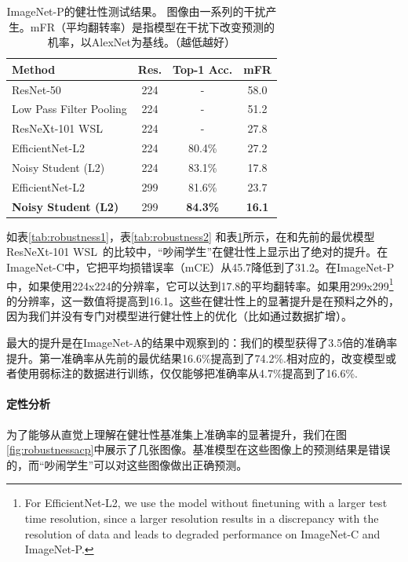 \documentclass[10pt]{article}
\begin{document}
\begin{table}[h!]
	\small
	\centering
	\begin{tabular}{l|c|cc}         
		\toprule 
		Method & Res. & Top-1 Acc. & mFR \\
		\midrule
		ResNet-50 \cite{hendrycks2018benchmarking} & 224 & - & 58.0 \\
		Low Pass Filter Pooling \cite{zhang2019making} &224 & - & 51.2 \\
		
		ResNeXt-101 WSL~\cite{mahajan2018exploring,orhan2019robustness} & 224 & - & 27.8  \\
		\midrule
		EfficientNet-L2  & 224 & 80.4\% & 27.2  \\
		Noisy Student (L2) & 224 &  83.1\% & 17.8  \\
		EfficientNet-L2  & 299 & 81.6\% &  23.7 \\
		\bf Noisy Student (L2) & 299 & \bf 84.3\% & \bf 16.1 \\
		\bottomrule
	\end{tabular}
	\caption{ImageNet-P的健壮性测试结果。 图像由一系列的干扰产生。mFR（平均翻转率）是指模型在干扰下改变预测的机率，以AlexNet为基线。（越低越好）}  
	\label{tab:robustness3}
\end{table}

如表\ref{tab:robustness1}，表\ref{tab:robustness2} 和表\ref{tab:robustness3}所示，在和先前的最优模型ResNeXt-101 WSL~\cite{mahajan2018exploring,orhan2019robustness}的比较中，“吵闹学生”在健壮性上显示出了绝对的提升。在ImageNet-C中，它把平均损错误率（mCE）从45.7降低到了31.2。在ImageNet-P中，如果使用224x224的分辨率，它可以达到17.8的平均翻转率。如果用299x299\footnote{For EfficientNet-L2, we use the model without finetuning with a larger test time resolution, since a larger resolution results in a discrepancy with the resolution of data and leads to degraded performance on ImageNet-C and ImageNet-P.}的分辨率，这一数值将提高到16.1。这些在健壮性上的显著提升是在预料之外的，因为我们并没有专门对模型进行健壮性上的优化（比如通过数据扩增）。  


最大的提升是在ImageNet-A的结果中观察到的：我们的模型获得了3.5倍的准确率提升。第一准确率从先前的最优结果16.6\%提高到了74.2\%.相对应的，改变模型或者使用弱标注的数据进行训练，仅仅能够把准确率从4.7\%提高到了16.6\%.

\paragraph{定性分析}
为了能够从直觉上理解在健壮性基准集上准确率的显著提升，我们在图\ref{fig:robustnessacp}中展示了几张图像。基准模型在这些图像上的预测结果是错误的，而“吵闹学生”可以对这些图像做出正确预测。  
\end{document}
